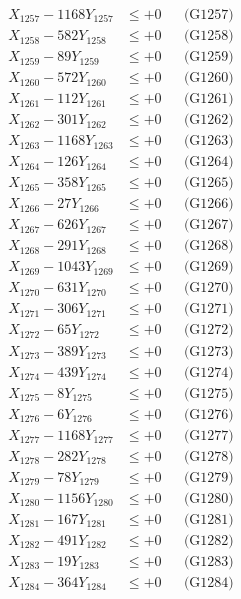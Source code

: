 \documentclass[a4paper,10pt]{article}
\begin{document}
{\begin{align}
X_{1257} - 1168Y_{1257} &\leq +0 && \text{(G1257)} \\
X_{1258} - 582Y_{1258} &\leq +0 && \text{(G1258)} \\
X_{1259} - 89Y_{1259} &\leq +0 && \text{(G1259)} \\
X_{1260} - 572Y_{1260} &\leq +0 && \text{(G1260)} \\
\allowbreak
X_{1261} - 112Y_{1261} &\leq +0 && \text{(G1261)} \\
X_{1262} - 301Y_{1262} &\leq +0 && \text{(G1262)} \\
X_{1263} - 1168Y_{1263} &\leq +0 && \text{(G1263)} \\
X_{1264} - 126Y_{1264} &\leq +0 && \text{(G1264)} \\
X_{1265} - 358Y_{1265} &\leq +0 && \text{(G1265)} \\
X_{1266} - 27Y_{1266} &\leq +0 && \text{(G1266)} \\
X_{1267} - 626Y_{1267} &\leq +0 && \text{(G1267)} \\
X_{1268} - 291Y_{1268} &\leq +0 && \text{(G1268)} \\
X_{1269} - 1043Y_{1269} &\leq +0 && \text{(G1269)} \\
X_{1270} - 631Y_{1270} &\leq +0 && \text{(G1270)} \\
\allowbreak
X_{1271} - 306Y_{1271} &\leq +0 && \text{(G1271)} \\
X_{1272} - 65Y_{1272} &\leq +0 && \text{(G1272)} \\
X_{1273} - 389Y_{1273} &\leq +0 && \text{(G1273)} \\
X_{1274} - 439Y_{1274} &\leq +0 && \text{(G1274)} \\
X_{1275} - 8Y_{1275} &\leq +0 && \text{(G1275)} \\
X_{1276} - 6Y_{1276} &\leq +0 && \text{(G1276)} \\
X_{1277} - 1168Y_{1277} &\leq +0 && \text{(G1277)} \\
X_{1278} - 282Y_{1278} &\leq +0 && \text{(G1278)} \\
X_{1279} - 78Y_{1279} &\leq +0 && \text{(G1279)} \\
X_{1280} - 1156Y_{1280} &\leq +0 && \text{(G1280)} \\
\allowbreak
X_{1281} - 167Y_{1281} &\leq +0 && \text{(G1281)} \\
X_{1282} - 491Y_{1282} &\leq +0 && \text{(G1282)} \\
X_{1283} - 19Y_{1283} &\leq +0 && \text{(G1283)} \\
X_{1284} - 364Y_{1284} &\leq +0 && \text{(G1284)} \\

\end{align}}
\end{document}
